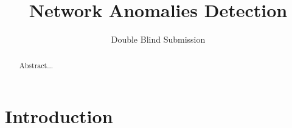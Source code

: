 \documentclass{sig-alternate}
\begin{document}

\title{Network Anomalies Detection}


\author{
	\alignauthor
	Double Blind Submission
%
}

\maketitle

\begin{abstract}
Abstract...
\end{abstract}



\section{Introduction}
\label{sec:intro}
\end{document}
